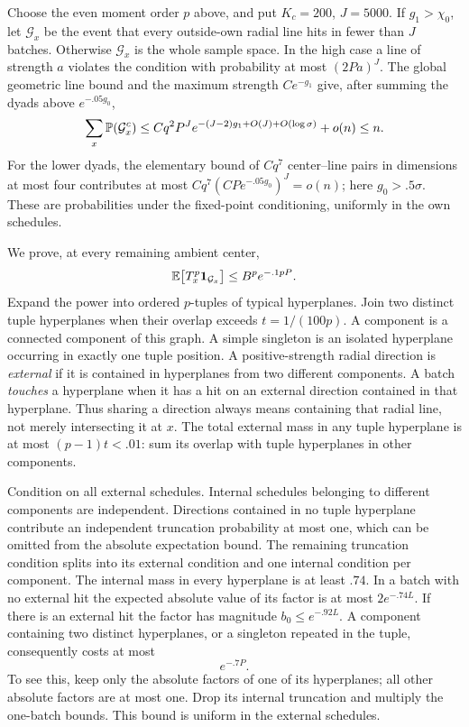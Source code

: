 Choose the even moment order \(p\) above, and put \(K_c=200\), \(J=5000\).
If \(g_1>\chi_0\), let \(\mathcal G_x\) be the event that every
outside-own radial line hits in fewer than \(J\) batches.  Otherwise
\(\mathcal G_x\) is the whole sample space.  In the high case a line of
strength \(a\) violates the condition with probability at most
\((2Pa)^J\).  The global geometric line bound and the maximum strength
\(Ce^{-g_1}\) give, after summing the dyads above \(e^{-.05g_0}\),
\[
 \sum_x\mathbb P(\mathcal G_x^c)
 \le Cq^2P^J e^{-(J-2)g_1+O(J)+O(\log\sigma)}+o(n)\le n.
\]
For the lower dyads, the elementary bound of \(Cq^7\) center--line pairs
in dimensions at most four contributes at most
\(Cq^7(CPe^{-.05g_0})^J=o(n)\); here \(g_0>.5\sigma\).
These are probabilities under the fixed-point conditioning, uniformly
in the own schedules.

We prove, at every remaining ambient center,
\begin{equation}
 \mathbb E\bigl[T_x^p\mathbf1_{\mathcal G_x}\bigr]
 \le B^p e^{-.1pP}.
 \label{eq:ambient-high-moment}
\end{equation}
Expand the power into ordered \(p\)-tuples of typical hyperplanes.
Join two distinct tuple hyperplanes when their overlap exceeds
\(t=1/(100p)\).  A component is a connected component of this graph.
A simple singleton is an isolated hyperplane occurring in exactly one
tuple position. A positive-strength radial direction is \emph{external}
if it is contained in hyperplanes from two different components.
A batch \emph{touches} a hyperplane when it has a hit on an external
direction contained in that hyperplane. Thus sharing a direction always
means containing that radial line, not merely intersecting it at $x$.  The total external mass in any tuple hyperplane is at
most \((p-1)t<.01\): sum its overlap with tuple hyperplanes in other
components.

Condition on all external schedules.  Internal schedules belonging to
different components are independent.  Directions contained in no tuple
hyperplane contribute an independent truncation probability at most one,
which can be omitted from the absolute expectation bound.  The remaining
truncation condition splits into its external condition and one internal
condition per component.
The internal mass in every hyperplane is at least \(.74\).
In a batch with no external hit the expected absolute value of its factor is at
most \(2e^{-.74L}\).  If there is an external hit the factor has magnitude
\(b_0\le e^{-.92L}\).  A component containing two distinct hyperplanes,
or a singleton repeated in the tuple, consequently costs at most
\begin{equation}
 e^{-.7P}.
 \label{eq:nonsimple-attenuation}
\end{equation}
To see this, keep only the absolute factors of one of its hyperplanes;
all other absolute factors are at most one.  Drop its internal
truncation and multiply the one-batch bounds.  This bound is uniform in
the external schedules.

